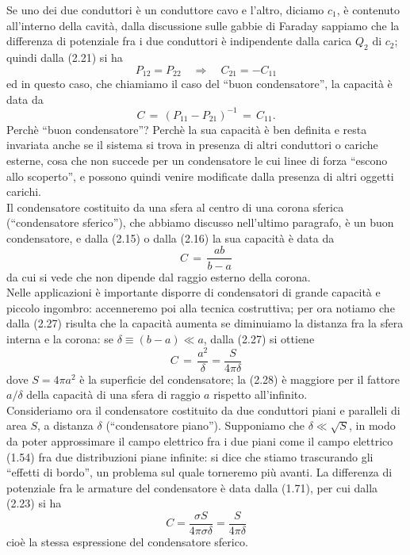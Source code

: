 Se uno dei due conduttori \`e un conduttore cavo e l'altro, diciamo $c_1$, \`e
contenuto all'interno della cavit\`a, dalla discussione sulle gabbie di Faraday
sappiamo che la differenza di potenziale fra i due conduttori \`e indipendente
dalla carica $Q_2$ di $c_2$; quindi dalla (2.21) si ha
\begin{equation}
  P_{12}=P_{22}\quad\Rightarrow\quad C_{21}=-C_{11}
  \tag{2.25}
\end{equation}
ed in questo caso, che chiamiamo il caso del ``buon condensatore'', la
capacit\`a \`e data da
\begin{equation}
  C\,=\,(P_{11}-P_{21})^{-1}\,=\,C_{11}.
  \tag{2.26}
\end{equation}
Perch\`e ``buon condensatore''? Perch\`e la sua capacit\`a \`e ben definita e
resta invariata anche se il sistema si trova in presenza di altri conduttori o
cariche esterne, cosa che non succede per un condensatore le cui linee di forza
``escono allo scoperto'', e possono quindi venire modificate dalla presenza di
altri oggetti carichi.\\
Il condensatore costituito da una sfera al centro di una corona sferica
(``condensatore sferico''), che abbiamo discusso nell'ultimo paragrafo, \`e un
buon condensatore, e dalla (2.15) o dalla (2.16) la sua capacit\`a \`e data da
\begin{equation}
  C\,=\,\frac{ab}{b-a}
  \tag{2.27}
\end{equation}
da cui si vede che non dipende dal raggio esterno della corona.\\
Nelle applicazioni \`e importante disporre di condensatori di grande capacit\`a
e piccolo ingombro: accenneremo poi alla tecnica costruttiva; per ora notiamo
che dalla (2.27) risulta che la capacit\`a aumenta se diminuiamo la distanza fra
la sfera interna e la corona: se $\delta\equiv(b-a)\ll a$, dalla (2.27) si
ottiene
\begin{equation}
  C\,=\,\frac{a^2}{\delta}=\frac{S}{4\pi\delta}
  \tag{2.28}
\end{equation}
dove $S=4\pi a^2$ \`e la superficie del condensatore; la (2.28) \`e maggiore per
il fattore $a/\delta$ della capacit\`a di una sfera di raggio $a$ rispetto
all'infinito.\\
Consideriamo ora il condensatore costituito da due conduttori piani e paralleli
di area $S$, a distanza $\delta$ (``condensatore piano''). Supponiamo che
$\delta\ll\sqrt S$, in modo da poter approssimare il campo elettrico fra i due
piani come il campo elettrico (1.54) fra due distribuzioni piane infinite: si
dice che stiamo trascurando gli ``effetti di bordo'', un problema sul quale
torneremo pi\`u avanti. La differenza di potenziale fra le armature del
condensatore \`e data dalla (1.71), per cui dalla (2.23) si ha
\begin{equation}
  C=\frac{\sigma S}{4\pi\sigma\delta}=\frac{S}{4\pi\delta}
  \tag{2.29}
\end{equation}
cio\`e la stessa espressione del condensatore sferico.

